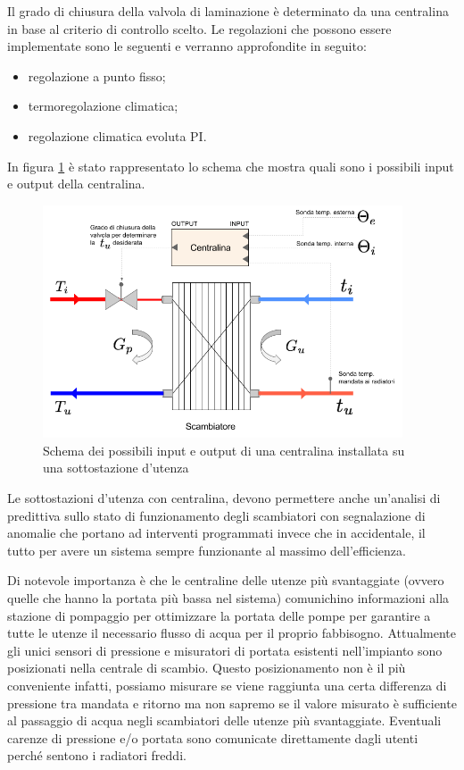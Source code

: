 \documentclass[laurea,oneside,11pt]{USiena_tesiLM}
\begin{document}
Il grado di chiusura della valvola di laminazione è determinato da una centralina in base al criterio di controllo scelto. Le regolazioni che possono essere implementate sono le seguenti e verranno approfondite in seguito:

\begin{itemize}
\item regolazione a punto fisso;
\item termoregolazione climatica;
\item regolazione climatica evoluta PI.
\end{itemize}  

In figura \ref{fig:schema_centralina} è stato rappresentato lo schema che mostra quali sono i possibili input e output della centralina.

\begin{figure}[!ht]
\centering
\includegraphics[width=0.95\textwidth]{figure/schema_centralina} 
\caption{Schema dei possibili input e output di una centralina installata su una sottostazione d'utenza}
\label{fig:schema_centralina}
\end{figure}


Le sottostazioni d'utenza con centralina, devono permettere anche un'analisi di predittiva sullo stato di funzionamento degli scambiatori con segnalazione di anomalie che portano ad interventi programmati invece che in accidentale, il tutto per avere un sistema sempre funzionante al massimo dell'efficienza.

Di notevole importanza è che le centraline delle utenze più svantaggiate (ovvero quelle che hanno la portata più bassa nel sistema) comunichino informazioni alla stazione di pompaggio per ottimizzare la portata delle pompe per garantire a tutte le utenze il necessario flusso di acqua per il proprio fabbisogno. Attualmente gli unici sensori di pressione e misuratori di portata esistenti nell'impianto sono posizionati nella centrale di scambio. Questo posizionamento non è il più conveniente infatti, possiamo misurare se viene raggiunta una certa differenza di pressione tra mandata e ritorno ma non sapremo se il valore misurato è sufficiente al passaggio di acqua negli scambiatori delle utenze più svantaggiate. Eventuali carenze di pressione e/o portata sono comunicate direttamente dagli utenti perché sentono i radiatori freddi.
\end{document}
